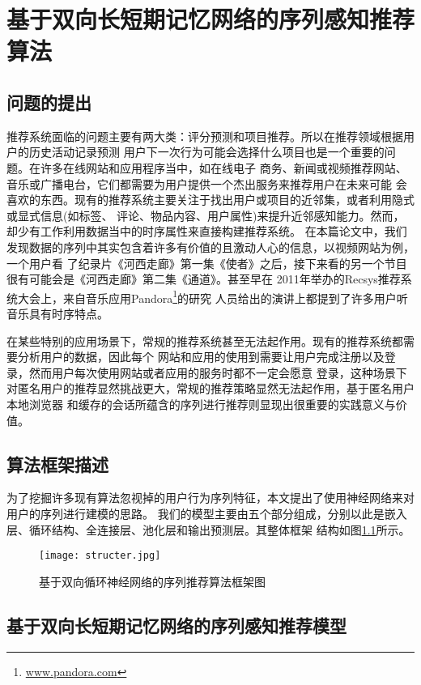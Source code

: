 ﻿%
\chapter{基于双向长短期记忆网络的序列感知推荐算法}

\section{问题的提出}
推荐系统面临的问题主要有两大类：评分预测和项目推荐。所以在推荐领域根据用户的历史活动记录预测%
用户下一次行为可能会选择什么项目也是一个重要的问题。在许多在线网站和应用程序当中，如在线电子%
商务、新闻或视频推荐网站、音乐或广播电台，它们都需要为用户提供一个杰出服务来推荐用户在未来可能%
会喜欢的东西。现有的推荐系统主要关注于找出用户或项目的近邻集，或者利用隐式或显式信息(如标签、%
评论、物品内容、用户属性)来提升近邻感知能力。然而，却少有工作利用数据当中的时序属性来直接构建推荐系统。%
在本篇论文中，我们发现数据的序列中其实包含着许多有价值的且激动人心的信息，以视频网站为例，一个用户看%
了纪录片《河西走廊》第一集《使者》之后，接下来看的另一个节目很有可能会是《河西走廊》第二集《通道》。甚至早在%
2011年举办的Recsys推荐系统大会上，来自音乐应用Pandora\footnote{\url{www.pandora.com}}的研究%
人员给出的演讲上都提到了许多用户听音乐具有时序特点。%

在某些特别的应用场景下，常规的推荐系统甚至无法起作用。现有的推荐系统都需要分析用户的数据，因此每个%
网站和应用的使用到需要让用户完成注册以及登录，然而用户每次使用网站或者应用的服务时都不一定会愿意%
登录，这种场景下对匿名用户的推荐显然挑战更大，常规的推荐策略显然无法起作用，基于匿名用户本地浏览器%
和缓存的会话所蕴含的序列进行推荐则显现出很重要的实践意义与价值。

\section{算法框架描述}

为了挖掘许多现有算法忽视掉的用户行为序列特征，本文提出了使用神经网络来对用户的序列进行建模的思路。%
我们的模型主要由五个部分组成，分别以此是嵌入层、循环结构、全连接层、池化层和输出预测层。其整体框架%
结构如图\ref{fig:structer}所示。

\begin{figure}[htb]
  \centering
  \texttt{[image: structer.jpg]}\\
  \caption{基于双向循环神经网络的序列推荐算法框架图}
  \label{fig:structer}
\end{figure}
%


\section{基于双向长短期记忆网络的序列感知推荐模型}
